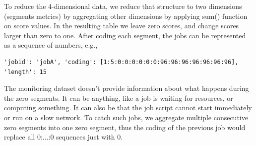 \documentclass[]{llncs}
\begin{document}

To reduce the 4-dimensional data, we reduce that structure to two dimensions (segments metrics) by aggregating other dimensions by applying sum() function on score values.
In the resulting table we leave zero scores, and change scores larger than zero to one.
After coding each segment, the jobs can be represented as a sequence of numbers, e.g.,
\begin{lstlisting}
'jobid': 'jobA', 'coding': [1:5:0:0:0:0:0:0:96:96:96:96:96:96:96], 'length': 15
\end{lstlisting}
The monitoring dataset doesn't provide information about what happens during the zero segments.
It can be anything, like a job is waiting for resources, or computing something.
It can also be that the job script cannot start immediately or run on a slow network.
To catch such jobs, we aggregate multiple consecutive zero segments into one zero segment, thus the coding of the previous job would replace all 0:...:0 sequences just with 0.
\end{document}
